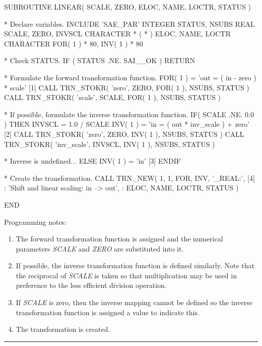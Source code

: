 \documentclass[twoside,nolof,11pt]{starlink}
\providecommand{\fortvar}[1]{\emph{#1}}
\providecommand{\exampledone}[0]{\begin{center} \rule{6em}{0.2mm} \end{center}}
\begin{document}
\begin{terminalv}
      SUBROUTINE LINEAR( SCALE, ZERO, ELOC, NAME, LOCTR, STATUS )

*  Declare variables.
      INCLUDE 'SAE_PAR'
      INTEGER STATUS, NSUBS
      REAL SCALE, ZERO, INVSCL
      CHARACTER * ( * ) ELOC, NAME, LOCTR
      CHARACTER FOR( 1 ) * 80, INV( 1 ) * 80

*  Check STATUS.
      IF ( STATUS .NE. SAI__OK ) RETURN

*  Formulate the forward transformation function.
      FOR( 1 ) = 'out = ( in - zero ) * scale'                 [1]
      CALL TRN_STOKR( 'zero', ZERO, FOR( 1 ), NSUBS, STATUS )
      CALL TRN_STOKR( 'scale', SCALE, FOR( 1 ), NSUBS, STATUS )

*  If possible, formulate the inverse transformation function.
      IF( SCALE .NE. 0.0 ) THEN
         INVSCL = 1.0 / SCALE
         INV( 1 ) = 'in = ( out * inv_scale ) + zero'          [2]
         CALL TRN_STOKR( 'zero', ZERO, INV( 1 ), NSUBS, STATUS )
         CALL TRN_STOKR( 'inv_scale', INVSCL, INV( 1 ), NSUBS, STATUS )

*  Inverse is undefined...
      ELSE
         INV( 1 ) = 'in'                                       [3]
      ENDIF

*  Create the transformation.
      CALL TRN_NEW( 1, 1, FOR, INV, '_REAL:',                  [4]
     :              'Shift and linear scaling: in --> out',
     :              ELOC, NAME, LOCTR, STATUS )

      END
\end{terminalv}

Programming notes:

\begin{enumerate}

\item The forward transformation function is assigned and the numerical
parameters \fortvar{SCALE} and \fortvar{ZERO} are substituted into it.

\item If possible, the inverse transformation function is defined similarly.
Note that the reciprocal of \fortvar{SCALE} is taken so that multiplication
may be used in preference to the less efficient division operation.

\item If \fortvar{SCALE} is zero, then the inverse mapping cannot be defined
so the inverse transformation function is assigned a value to indicate this.

\item The transformation is created.

\end{enumerate}
\exampledone
\end{document}
